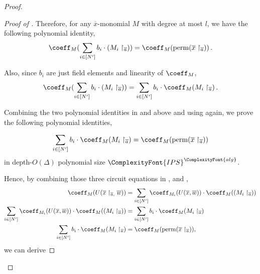 \documentclass[11pt,letter]{article}
\theoremstyle{remark} %
\newcommand{\perm}{{\rm perm}}
\newcommand{\alg}{\ComplexityFont{alg}}
\newcommand{\IPS}{%
    {
        \ComplexityFont{IPS} 
    }
}
\begin{document}
{\begin{proof}
\begin{proof}[Proof of ]
        Therefore, for any $\overline{x}$-monomial $M$ with degree at most $l$, we have the following polynomial identity,
        \begin{equation}
            \label{equa: apply coefficient to perm identity}
            \coeff_M(\sum_{i\in [N^\prime]} b_i \cdot (M_i\restriction_{\overline{a}})) = \coeff_M(\perm(\overline{x}\restriction_{\overline{a}}))\,.
        \end{equation}
        
        Also, since $b_i$ are just field elements and linearity of $\coeff_M$, 
        \begin{equation}
            \label{equa: take bi out}
            \coeff_M(\sum_{i \in [N^\prime]} b_i \cdot (M_i\restriction_{\overline{a}}))  = \sum_{i \in [N^\prime]} b_i \cdot \coeff_M(M_i\restriction_{\overline{a}}) \,.
        \end{equation}
        
        Combining the two polynomial identities in  and  above and using  again, we prove the following polynomial identities,
        

        \begin{equation}
            \label{equa: third polynomial identity in IPS}
            \sum_{i \in [N^\prime]} b_i \cdot \coeff_M(M_i\restriction_{\overline{a}}) = \coeff_M(\perm(\overline{x}\restriction_{\overline{a}}))
        \end{equation}
        in depth-$O(\Delta)$ polynomial size $\IPS^\alg$.

        \bigskip
        
        Hence, by combining those three circuit equations in ,  and ,
        \begin{align*}
            \coeff_M( U(\overline{x}\restriction_{\overline{a},} \overline{w})) &= \sum_{i\in [N^\prime]} \coeff_{M_i}(U(\overline{x}, \overline{w})) \cdot \coeff_M( (M_i\restriction_{\overline{a}}))\\
            \sum_{i\in [N^\prime]} \coeff_{M_i}(U(\overline{x}, \overline{w})) \cdot \coeff_M( (M_i\restriction_{\overline{a}})) &= \sum_{i \in [N^\prime]} b_i \cdot \coeff_M(M_i\restriction_{\overline{a}})\\
            \sum_{i \in [N^\prime]} b_i \cdot \coeff_M(M_i\restriction_{\overline{a}}) &= \coeff_M(\perm(\overline{x}\restriction_{\overline{a}})),
        \end{align*}
        we can derive
        

\end{proof}
\end{proof}}
\end{document}
